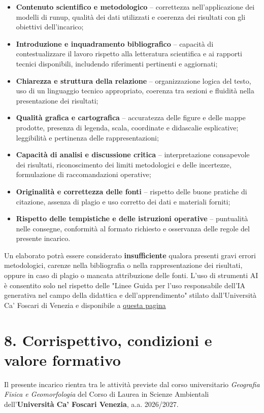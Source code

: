 \documentclass[11pt,a4paper,roman]{moderncv}
\begin{document}
\begin{itemize}
  \item \textbf{Contenuto scientifico e metodologico} – correttezza nell’applicazione dei modelli di runup, qualità dei dati utilizzati e coerenza dei risultati con gli obiettivi dell’incarico;
  \item \textbf{Introduzione e inquadramento bibliografico} – capacità di contestualizzare il lavoro rispetto alla letteratura scientifica e ai rapporti tecnici disponibili, includendo riferimenti pertinenti e aggiornati;
  \item \textbf{Chiarezza e struttura della relazione} – organizzazione logica del testo, uso di un linguaggio tecnico appropriato, coerenza tra sezioni e fluidità nella presentazione dei risultati;
  \item \textbf{Qualità grafica e cartografica} – accuratezza delle figure e delle mappe prodotte, presenza di legenda, scala, coordinate e didascalie esplicative; leggibilità e pertinenza delle rappresentazioni;
  \item \textbf{Capacità di analisi e discussione critica} – interpretazione consapevole dei risultati, riconoscimento dei limiti metodologici e delle incertezze, formulazione di raccomandazioni operative;
  \item \textbf{Originalità e correttezza delle fonti} – rispetto delle buone pratiche di citazione, assenza di plagio e uso corretto dei dati e materiali forniti;
  \item \textbf{Rispetto delle tempistiche e delle istruzioni operative} – puntualità nelle consegne, conformità al formato richiesto e osservanza delle regole del presente incarico.
\end{itemize}

Un elaborato potrà essere considerato \textbf{insufficiente} qualora presenti gravi errori metodologici, carenze nella bibliografia o nella rappresentazione dei risultati, oppure in caso di plagio o mancata attribuzione delle fonti. L'uso di strumenti AI è consentito solo nel rispetto delle "Linee Guida per l’uso responsabile dell’IA generativa nel campo della didattica e dell’apprendimento" stilato dall'Università Ca' Foscari di Venezia e disponibile a \underline{\href{https://www.unive.it/pag/fileadmin/user_upload/ateneo/norme_regolamenti/regolamenti/servizi-informatici/Linee_Guida_IA_Didattica.pdf}{questa pagina}}

\section*{8. Corrispettivo, condizioni e valore formativo}
Il presente incarico rientra tra le attività previste dal corso universitario \textit{Geografia Fisica e Geomorfologia} del Corso di Laurea in Scienze Ambientali dell’\textbf{Università Ca’ Foscari Venezia}, a.a. 2026/2027.
  
\end{document}

